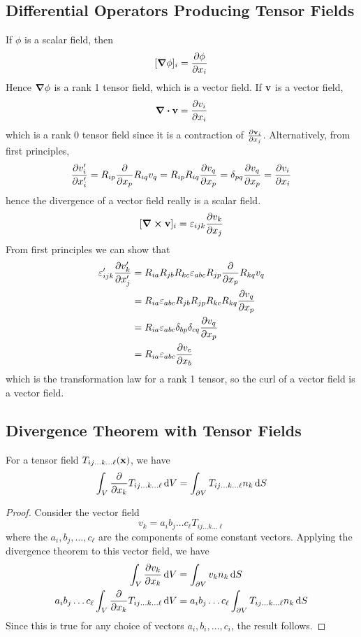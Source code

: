 \subsection{Differential Operators Producing Tensor Fields}
If $\phi$ is a scalar field, then
\[ [\grad\phi]_i = \pdv{\phi}{x_i} \]
Hence $\grad\phi$ is a rank 1 tensor field, which is a vector field. If $\vb v$ is a vector field,
\[ \div \vb v = \pdv{v_i}{x_i} \]
which is a rank 0 tensor field since it is a contraction of $\pdv{\vb v_i}{x_j}$. Alternatively, from first principles,
\[ \pdv{v_i'}{x_i'} = R_{ip}\pdv{x_p}R_{iq}v_q = R_{ip}R_{iq}\pdv{v_q}{x_p} = \delta_{pq}\pdv{v_q}{x_p} = \pdv{v_i}{x_i} \]
hence the divergence of a vector field really is a scalar field.
\[ [\curl \vb v]_i = \varepsilon_{ijk} \pdv{v_k}{x_j} \]
From first principles we can show that
\begin{align*}
	\varepsilon_{ijk}' \pdv{v_k'}{x_j'} & = R_{ia}R_{jb}R_{kc}\varepsilon_{abc} R_{jp}\pdv{x_p} R_{kq}v_q       \\
	                                    & = R_{ia} \varepsilon_{abc} R_{jb} R_{jp} R_{kc} R_{kq} \pdv{v_q}{x_p} \\
	                                    & = R_{ia} \varepsilon_{abc} \delta_{bp} \delta_{cq} \pdv{v_q}{x_p}     \\
	                                    & = R_{ia} \varepsilon_{abc} \pdv{v_c}{x_b}
\end{align*}
which is the transformation law for a rank 1 tensor, so the curl of a vector field is a vector field.

\subsection{Divergence Theorem with Tensor Fields}
\begin{proposition}
	For a tensor field $T_{ij\dots k \dots \ell}(\vb x)$, we have
	\[ \int_V \pdv{x_k} T_{ij\dots k \dots \ell} \dd{V} = \int_{\partial V} T_{ij\dots k \dots \ell} n_k \dd{S} \]
\end{proposition}
\begin{proof}
	Consider the vector field
	\[ v_k = a_i b_j \dots c_\ell T_{ij\dots k \dots \ell} \]
	where the $a_i, b_j, \dots, c_\ell$ are the components of some constant vectors. Applying the divergence theorem to this vector field, we have
	\begin{align*}
		\int_V \pdv{v_k}{x_k} \dd{V}                                         & = \int_{\partial V} v_k n_k \dd{S}                                          \\
		a_i b_j \dots c_\ell \int_V \pdv{x_k} T_{ij\dots k\dots \ell} \dd{V} & = a_i b_j \dots c_\ell \int_{\partial V} T_{ij\dots k\dots \ell} n_k \dd{S}
	\end{align*}
	Since this is true for any choice of vectors $a_i, b_i, \dots, c_i$, the result follows.
\end{proof}
